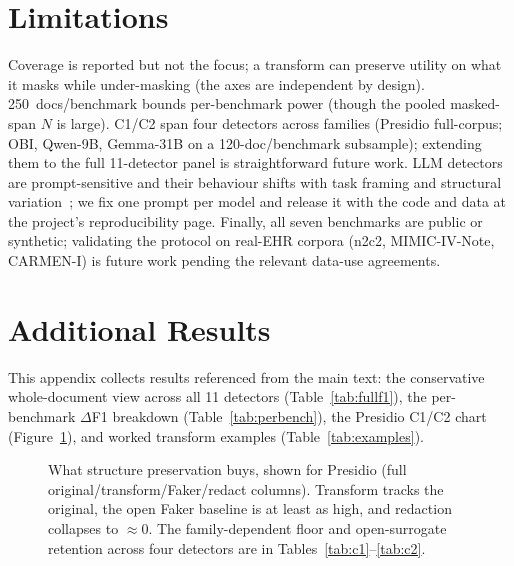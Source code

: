 \documentclass[pmlr,twocolumn,10pt]{jmlr}
\begin{document}
\section{Limitations}
Coverage is reported but not the focus; a transform can preserve utility on what it masks while under-masking (the axes are independent by design). 250~docs/benchmark bounds per-benchmark power (though the pooled masked-span $N$ is large). C1/C2 span four detectors across families (Presidio full-corpus; OBI, Qwen-9B, Gemma-31B on a 120-doc/benchmark subsample); extending them to the full 11-detector panel is straightforward future work. LLM detectors are prompt-sensitive and their behaviour shifts with task framing and structural variation~\citep{gendron2024abstract,bao2024robustness}; we fix one prompt per model and release it with the code and data at the project's reproducibility page. Finally, all seven benchmarks are public or synthetic; validating the protocol on real-EHR corpora (n2c2, MIMIC-IV-Note, CARMEN-I) is future work pending the relevant data-use agreements.

\clearpage
\appendix

\section{Additional Results}\label{app:addl}
This appendix collects results referenced from the main text: the conservative whole-document view across all 11 detectors (Table~\ref{tab:fullf1}), the per-benchmark $\Delta$F1 breakdown (Table~\ref{tab:perbench}), the Presidio C1/C2 chart (Figure~\ref{fig:bars}), and worked transform examples (Table~\ref{tab:examples}).

\begin{figure}[htbp]
\centering
{}
\caption{What structure preservation buys, shown for Presidio (full original/transform/Faker/redact columns). Transform tracks the original, the open Faker baseline is at least as high, and redaction collapses to $\approx$0. The family-dependent floor and open-surrogate retention across four detectors are in Tables~\ref{tab:c1}--\ref{tab:c2}.}
\label{fig:bars}
\end{figure}
\end{document}
